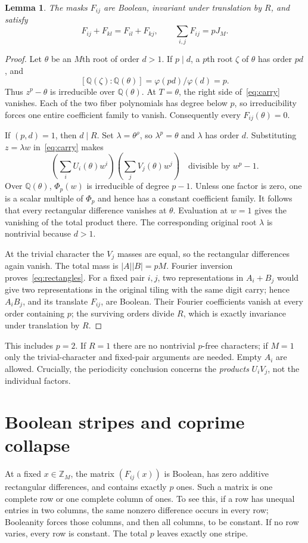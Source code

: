 \documentclass[11pt]{article}
\newtheorem{lemma}[theorem]{Lemma}
\newcommand{\Z}{\mathbb Z}
\newcommand{\Q}{\mathbb Q}
\newcommand{\PhiC}{\Phi}
\begin{document}
\begin{lemma}\label{lem:products}
The masks $F_{ij}$ are Boolean, invariant under translation by $R$, and satisfy
\begin{equation}\label{eq:rectangles}
 F_{ij}+F_{kl}=F_{il}+F_{kj},\qquad
 \sum_{i,j}F_{ij}=pJ_M.
\end{equation}
\end{lemma}
\begin{proof}
Let $\theta$ be an $M$th root of order $d>1$. If $p\mid d$, a $p$th root $\zeta$ of $\theta$ has order $pd$, and
\[
 [\Q(\zeta):\Q(\theta)]=\varphi(pd)/\varphi(d)=p.
\]
Thus $z^p-\theta$ is irreducible over $\Q(\theta)$. At $T=\theta$, the right side of~\eqref{eq:carry} vanishes. Each of the two fiber polynomials has degree below $p$, so irreducibility forces one entire coefficient family to vanish. Consequently every $F_{ij}(\theta)=0$.

If $(p,d)=1$, then $d\mid R$. Set $\lambda=\theta^\rho$, so $\lambda^p=\theta$ and $\lambda$ has order $d$. Substituting $z=\lambda w$ in~\eqref{eq:carry} makes
\[
 \left(\sum_i U_i(\theta)w^i\right)
 \left(\sum_j V_j(\theta)w^j\right)
 \quad\text{divisible by }w^p-1.
\]
Over $\Q(\theta)$, $\PhiC_p(w)$ is irreducible of degree $p-1$. Unless one factor is zero, one is a scalar multiple of $\PhiC_p$ and hence has a constant coefficient family. It follows that every rectangular difference vanishes at $\theta$. Evaluation at $w=1$ gives the vanishing of the total product there. The corresponding original root $\lambda$ is nontrivial because $d>1$.

At the trivial character the $V_j$ masses are equal, so the rectangular differences again vanish. The total mass is $|A||B|=pM$. Fourier inversion proves~\eqref{eq:rectangles}. For a fixed pair $i,j$, two representations in $A_i+B_j$ would give two representations in the original tiling with the same digit carry; hence $A_iB_j$, and its translate $F_{ij}$, are Boolean. Their Fourier coefficients vanish at every order containing $p$; the surviving orders divide $R$, which is exactly invariance under translation by $R$.
\end{proof}

This includes $p=2$. If $R=1$ there are no nontrivial $p$-free characters; if $M=1$ only the trivial-character and fixed-pair arguments are needed. Empty $A_i$ are allowed. Crucially, the periodicity conclusion concerns the \emph{products} $U_iV_j$, not the individual factors.

\section{Boolean stripes and coprime collapse}
At a fixed $x\in\Z_M$, the matrix $(F_{ij}(x))$ is Boolean, has zero additive rectangular differences, and contains exactly $p$ ones. Such a matrix is one complete row or one complete column of ones. To see this, if a row has unequal entries in two columns, the same nonzero difference occurs in every row; Booleanity forces those columns, and then all columns, to be constant. If no row varies, every row is constant. The total $p$ leaves exactly one stripe.
\end{document}
